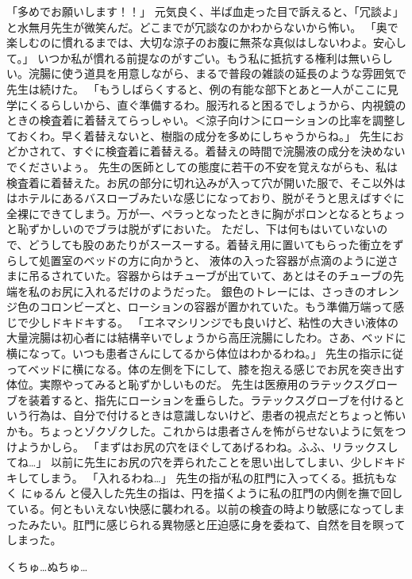 「多めでお願いします！！」
元気良く、半ば血走った目で訴えると、「冗談よ」と水無月先生が微笑んだ。どこまでが冗談なのかわからないから怖い。
「奥で楽しむのに慣れるまでは、大切な涼子のお腹に無茶な真似はしないわよ。安心して。」
いつか私が慣れる前提なのがすごい。もう私に抵抗する権利は無いらしい。浣腸に使う道具を用意しながら、まるで普段の雑談の延長のような雰囲気で先生は続けた。
「もうしばらくすると、例の有能な部下とあと一人がここに見学にくるらしいから、直ぐ準備するわ。服汚れると困るでしょうから、内視鏡のときの検査着に着替えてらっしゃい。＜涼子向け＞にローションの比率を調整しておくわ。早く着替えないと、樹脂の成分を多めにしちゃうからね。」
先生におどかされて、すぐに検査着に着替える。着替えの時間で浣腸液の成分を決めないでくださいよぅ。
先生の医師としての態度に若干の不安を覚えながらも、私は検査着に着替えた。お尻の部分に切れ込みが入って穴が開いた服で、そこ以外ははホテルにあるバスローブみたいな感じになっており、脱がそうと思えばすぐに全裸にできてしまう。万が一、ペラっとなったときに胸がポロンとなるとちょっと恥ずかしいのでブラは脱がずにおいた。
ただし、下は何もはいていないので、どうしても股のあたりがスースーする。着替え用に置いてもらった衝立をずらして処置室のベッドの方に向かうと、
液体の入った容器が点滴のように逆さまに吊るされていた。容器からはチューブが出ていて、あとはそのチューブの先端を私のお尻に入れるだけのようだった。
銀色のトレーには、さっきのオレンジ色のコロンビーズと、ローションの容器が置かれていた。もう準備万端って感じで少しドキドキする。
「エネマシリンジでも良いけど、粘性の大きい液体の大量浣腸は初心者には結構辛いでしょうから高圧浣腸にしたわ。さあ、ベッドに横になって。いつも患者さんにしてるから体位はわかるわね。」
先生の指示に従ってベッドに横になる。体の左側を下にして、膝を抱える感じでお尻を突き出す体位。実際やってみると恥ずかしいものだ。
先生は医療用のラテックスグローブを装着すると、指先にローションを垂らした。ラテックスグローブを付けるという行為は、自分で付けるときは意識しないけど、患者の視点だとちょっと怖いかも。ちょっとゾクゾクした。これからは患者さんを怖がらせないように気をつけようかしら。
「まずはお尻の穴をほぐしてあげるわね。ふふ、リラックスしてね…」
以前に先生にお尻の穴を弄られたことを思い出してしまい、少しドキドキしてしまう。
「入れるわね…」
先生の指が私の肛門に入ってくる。抵抗もなく にゅるん と侵入した先生の指は、円を描くように私の肛門の内側を撫で回している。何ともいえない快感に襲われる。以前の検査の時より敏感になってしまったみたい。肛門に感じられる異物感と圧迫感に身を委ねて、自然を目を瞑ってしまった。

くちゅ…ぬちゅ…


